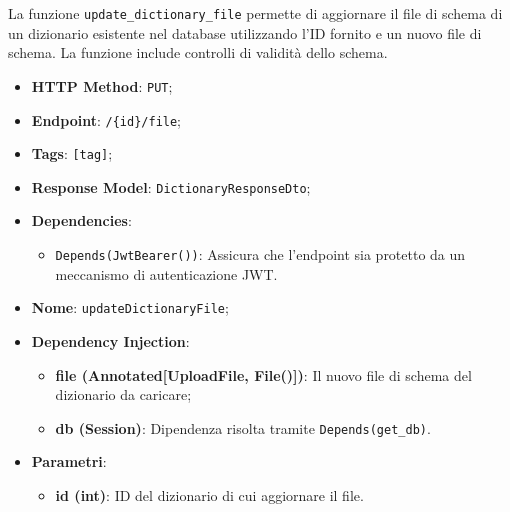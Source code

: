 \par La funzione \texttt{update\_dictionary\_file} permette di aggiornare il file di schema di un dizionario esistente nel database utilizzando l'ID fornito e un nuovo file di schema. La funzione include controlli di validità dello schema.

\begin{itemize}
 \item \textbf{HTTP Method}: \texttt{PUT};
 \item \textbf{Endpoint}: \texttt{/\{id\}/file};
 \item \textbf{Tags}: \texttt{[tag]};
 \item \textbf{Response Model}: \texttt{DictionaryResponseDto};
 \item \textbf{Dependencies}:
  \begin{itemize}
    \item \texttt{Depends(JwtBearer())}: Assicura che l'endpoint sia protetto da un meccanismo di autenticazione JWT.
  \end{itemize}
 \item \textbf{Nome}: \texttt{updateDictionaryFile};
 \item \textbf{Dependency Injection}:
  \begin{itemize}
    \item \textbf{file (Annotated[UploadFile, File()])}: Il nuovo file di schema del dizionario da caricare;
    \item \textbf{db (Session)}: Dipendenza risolta tramite \texttt{Depends(get\_db)}.
  \end{itemize}
 \item \textbf{Parametri}:
  \begin{itemize}
    \item \textbf{id (int)}: ID del dizionario di cui aggiornare il file.
  \end{itemize}
\end{itemize}

